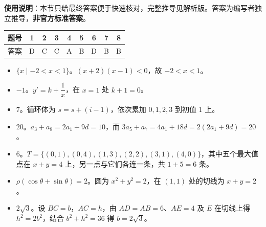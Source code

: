 
\begin{gknotice}
\textbf{使用说明}：本节只给最终答案便于快速核对，完整推导见解析版。答案为编写者独立推导，\textbf{非官方标准答案}。
\end{gknotice}

\begin{center}\begin{tabular}{ccccccccc}
\toprule
题号 & 1 & 2 & 3 & 4 & 5 & 6 & 7 & 8 \\
\midrule
答案 & D & C & C & A & B & D & B & B \\
\bottomrule
\end{tabular}\end{center}

\begin{itemize}[leftmargin=2.6em]
  \item[\textbf{9.}] $\{x\mid -2<x<1\}$。$(x+2)(x-1)<0$，故 $-2<x<1$。
  \item[\textbf{10.}] $-1$。$y'=k+\dfrac1x$，在 $x=1$ 处 $k+1=0$。
  \item[\textbf{11.}] $7$。循环体为 $s=s+(i-1)$，依次累加 $0,1,2,3$ 到初值 $1$ 上。
  \item[\textbf{12.}] $20$。$a_3+a_8=2a_1+9d=10$，而 $3a_5+a_7=4a_1+18d=2(2a_1+9d)=20$。
  \item[\textbf{13.}] $6$。$T=\{(0,1),(0,4),(1,3),(2,2),(3,1),(4,0)\}$，其中五个最大值点在 $x+y=4$ 上，另一点与它们各连一条，共 $1+5=6$ 条。
  \item[\textbf{14.}] $\rho(\cos\theta+\sin\theta)=2$。圆为 $x^2+y^2=2$，在 $(1,1)$ 处的切线为 $x+y=2$。
  \item[\textbf{15.}] $2\sqrt3$。设 $BC=b$，$AC=h$，由 $AD=AB=6$、$AE=4$ 及 $E$ 在切线上得 $h^2=2b^2$，结合 $b^2+h^2=36$ 得 $b=2\sqrt3$。
\end{itemize}

